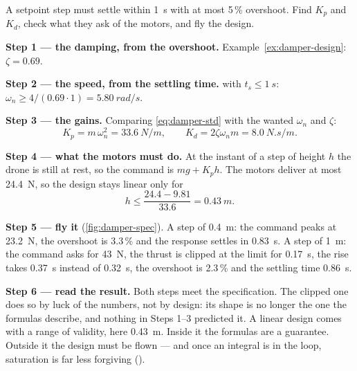 \begin{example}
\label{ex:damper-spec}
A setpoint step must settle within \SI{1}{s} with at most 5\,\% overshoot. Find $K_p$ and $K_d$, check what they ask of the motors, and fly the design.

\textbf{Step 1 — the damping, from the overshoot.} Example~\ref{ex:damper-design}: $\zeta = 0.69$.

\textbf{Step 2 — the speed, from the settling time.}  with $t_s \le \SI{1}{s}$: $\omega_n \ge 4/(0.69 \cdot 1) = \SI{5.80}{rad/s}$.

\textbf{Step 3 — the gains.} Comparing \cref{eq:damper-std} with the wanted $\omega_n$ and $\zeta$:
\begin{equation*}
  K_p = m\,\omega_n^2 = \SI{33.6}{N/m}, \qquad K_d = 2\zeta\omega_n m = \SI{8.0}{N.s/m}.
\end{equation*}

\textbf{Step 4 — what the motors must do.} At the instant of a step of height $h$ the drone is still at rest, so the command is $mg + K_p h$. The motors deliver at most \SI{24.4}{N}, so the design stays linear only for
\begin{equation*}
  h \le \frac{24.4 - 9.81}{33.6} = \SI{0.43}{m}.
\end{equation*}

\textbf{Step 5 — fly it} (\cref{fig:damper-spec}). A step of \SI{0.4}{m}: the command peaks at \SI{23.2}{N}, the overshoot is 3.3\,\% and the response settles in \SI{0.83}{s}. A step of \SI{1}{m}: the command asks for \SI{43}{N}, the thrust is clipped at the limit for \SI{0.17}{s}, the rise takes \SI{0.37}{s} instead of \SI{0.32}{s}, the overshoot is 2.3\,\% and the settling time \SI{0.86}{s}.

\textbf{Step 6 — read the result.} Both steps meet the specification. The clipped one does so by luck of the numbers, not by design: its shape is no longer the one the formulas describe, and nothing in Steps 1–3 predicted it. A linear design comes with a range of validity, here \SI{0.43}{m}. Inside it the formulas are a guarantee. Outside it the design must be flown — and once an integral is in the loop, saturation is far less forgiving ().
\end{example}


